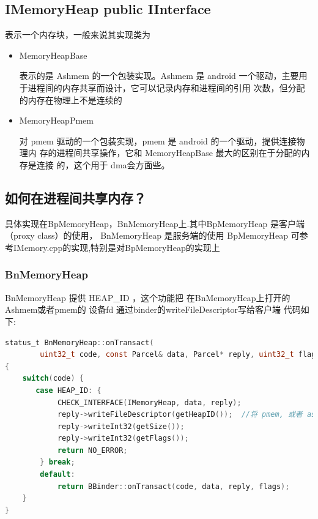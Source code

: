 \documentclass[a4paper,11pt]{article}
\begin{document}
\subsection{IMemoryHeap public IInterface}
表示一个内存块，一般来说其实现类为
\begin{itemize}
    \item MemoryHeapBase 

        表示的是 Ashmem 的一个包装实现。Ashmem 是 android
        一个驱动，主要用于进程间的内存共享而设计，它可以记录内存和进程间的引用
        次数，但分配的内存在物理上不是连续的

    \item MemoryHeapPmem  

        对 pmem 驱动的一个包装实现，pmem 是 android 的一个驱动，提供连接物理内
        存的进程间共享操作，它和 MemoryHeapBase 最大的区别在于分配的内存是连接
        的，这个用于 dma会方面些。
\end{itemize}
 
\subsection{ 如何在进程间共享内存？}
   具体实现在BpMemoryHeap，BnMemoryHeap上.其中BpMemoryHeap 是客户端（proxy class）的使用，
 BnMemoryHeap 是服务端的使用
  BpMemoryHeap
可参考IMemory.cpp的实现,特别是对BpMemoryHeap的实现上

\subsubsection{BnMemoryHeap}
  BnMemoryHeap  提供  HEAP_ID ，这个功能把 在BnMemoryHeap上打开的 Ashmem或者pmem的 设备fd 通过binder的writeFileDescriptor写给客户端
代码如下:
\begin{lstlisting}[language=c]
status_t BnMemoryHeap::onTransact(
        uint32_t code, const Parcel& data, Parcel* reply, uint32_t flags)
{
    switch(code) {
       case HEAP_ID: {
            CHECK_INTERFACE(IMemoryHeap, data, reply);
            reply->writeFileDescriptor(getHeapID());  //将 pmem, 或者 ashmem 的 fd 写给客户端
            reply->writeInt32(getSize());
            reply->writeInt32(getFlags());
            return NO_ERROR;
        } break;
        default:
            return BBinder::onTransact(code, data, reply, flags);
    }
}
\end{lstlisting}
 
\end{document}

